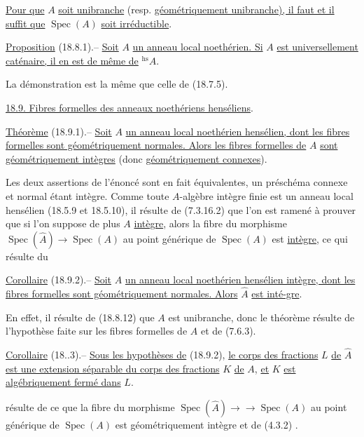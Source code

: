 
\uline{Pour que} $A$ \uline{soit unibranche} (resp. \uline{géométriquement unibranche), il faut et il suffit que} $\operatorname{Spec}(A)$ \uline{soit irréductible}.

\uline{Proposition} (18.8.1).-- \uline{Soit} $A$ \uline{un anneau local noethérien. Si} $A$ \uline{est universellement caténaire, il en est de même de} ${}^{\mathrm{hs}}A$.

La démonstration est la même que celle de (18.7.5).

\uline{18.9. Fibres formelles des anneaux noethériens henséliens}.

\uline{Théorème} (18.9.1).-- \uline{Soit} $A$ \uline{un anneau local noethérien hensélien, dont les fibres formelles sont géométriquement normales. Alors les fibres formelles de} $A$ \uline{sont géométriquement intègres} (donc \uline{géométriquement connexes}).

Les deux assertions de l'énoncé sont en fait équivalentes, un préschéma  connexe et normal étant intègre. Comme toute $A$-algèbre intègre finie est un anneau local hensélien (18.5.9 et 18.5.10), il résulte de (7.3.16.2) que l'on est ramené à prouver que si l'on suppose de plus $A$ \uline{intègre}, alors la fibre du morphisme $\operatorname{Spec}(\hat A)\to\operatorname{Spec}(A)$ au point générique de $\operatorname{Spec}(A)$ est \uline{intègre}, ce qui résulte du

\uline{Corollaire} (18.9.2).-- \uline{Soit} $A$ \uline{un anneau local noethérien hensélien intègre, dont les fibres formelles sont géométriquement normales. Alors} $\hat A$ \uline{est inté-}\uline{gre}.

En effet, il résulte de (18.8.12) que $A$ est unibranche, donc  le théorème résulte de l'hypothèse faite sur les fibres formelles de $A$ et de (7.6.3).

\uline{Corollaire} (18..3).-- \uline{Sous les hypothèses de} (18.9.2), \uline{le corps des fractions} $L$ \uline{de} $\hat A$ \uline{est une extension séparable du corps des fractions} $K$ \uline{de} $A$, \uline{et} $K$ \uline{est algébriquement fermé dans} $L$.

   résulte de ce que la fibre du morphisme $\operatorname{Spec}(\hat A)\to{}\to\operatorname{Spec}(A)$ au point générique de $\operatorname{Spec}(A)$ est géométriquement intègre et de (4.3.2) .

